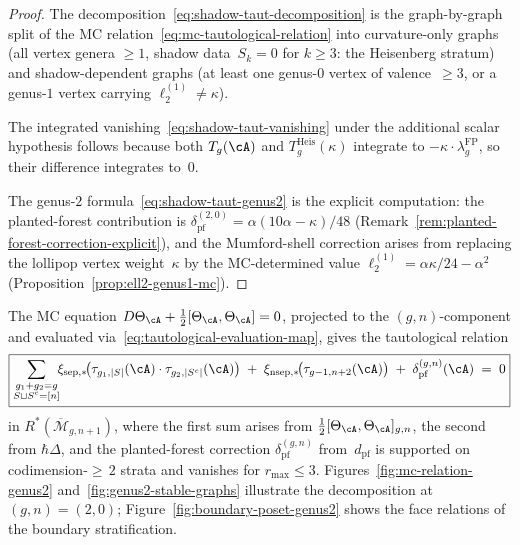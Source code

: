 \begin{proof}
The decomposition~\eqref{eq:shadow-taut-decomposition} is the
graph-by-graph split of the MC
relation~\eqref{eq:mc-tautological-relation} into
curvature-only graphs (all vertex genera $\geq 1$, shadow
data~$S_k = 0$ for $k \geq 3$: the Heisenberg stratum) and
shadow-dependent graphs (at least one genus-$0$ vertex of
valence~$\geq 3$, or a genus-$1$ vertex carrying
$\ell_2^{(1)} \neq \kappa$).

The integrated vanishing~\eqref{eq:shadow-taut-vanishing}
under the additional scalar hypothesis follows because both
$T_g(\cA)$ and $T_g^{\mathrm{Heis}}(\kappa)$ integrate to
$-\kappa \cdot \lambda_g^{\mathrm{FP}}$, so their difference
integrates to~$0$.

The genus-$2$ formula~\eqref{eq:shadow-taut-genus2} is the
explicit computation: the planted-forest contribution is
$\delta_{\mathrm{pf}}^{(2,0)} = \alpha(10\alpha{-}\kappa)/48$
(Remark~\ref{rem:planted-forest-correction-explicit}), and the
Mumford-shell correction arises from replacing the lollipop
vertex weight~$\kappa$ by the MC-determined
value $\ell_2^{(1)} = \alpha\kappa/24 - \alpha^2$
(Proposition~\ref{prop:ell2-genus1-mc}).
\end{proof}

\begin{theorem}
\label{thm:mc-tautological-descent}
\ClaimStatusProvedHere
{}
The MC equation
$D\Theta_\cA + \tfrac{1}{2}[\Theta_\cA, \Theta_\cA] = 0$,
projected to the $(g,n)$-component and evaluated via~\eqref{eq:tautological-evaluation-map},
gives the tautological relation
\begin{equation}\label{eq:mc-tautological-relation}
\boxed{
\sum_{\substack{g_1 + g_2 = g \\
S \sqcup S^c = [n]}}
\!\!
\xi_{\mathrm{sep},*}\!\bigl(
\tau_{g_1,|S|}(\cA) \cdot \tau_{g_2,|S^c|}(\cA) \bigr)
\;+\;
\xi_{\mathrm{nsep},*}\!\bigl(
\tau_{g-1,n+2}(\cA) \bigr)
\;+\;
\delta_{\mathrm{pf}}^{(g,n)}(\cA)
\;=\; 0
}
\end{equation}
in $R^*(\overline{\mathcal{M}}_{g,n+1})$, where
the first sum arises from
$\tfrac{1}{2}[\Theta_\cA, \Theta_\cA]_{g,n}$,
the second from $\hbar\Delta$, and the
planted-forest correction
$\delta_{\mathrm{pf}}^{(g,n)}$
from~$d_{\mathrm{pf}}$ is supported on
codimension-${\geq}\,2$ strata and vanishes for
$r_{\max} \leq 3$.
Figures~\textup{\ref{fig:mc-relation-genus2}}
and~\textup{\ref{fig:genus2-stable-graphs}} illustrate
the decomposition at $(g,n) = (2,0)$;
Figure~\textup{\ref{fig:boundary-poset-genus2}} shows
the face relations of the boundary stratification.
\end{theorem}

